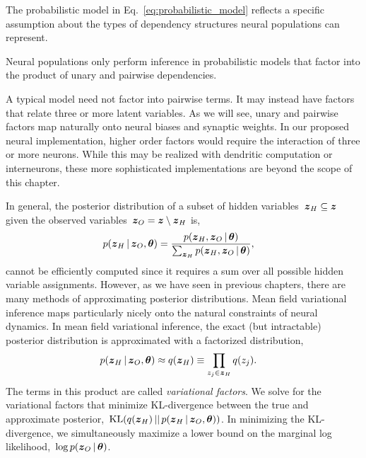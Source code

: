 The probabilistic model in Eq.~\ref{eq:probabilistic_model} reflects
a specific assumption about the types of dependency structures
neural populations can represent.

\begin{assumption}
  Neural populations only perform inference in probabilistic models
  that factor into the product of unary and pairwise dependencies. 
\end{assumption}

A typical model need not factor into pairwise terms. It may instead
have factors that relate three or more latent variables. As we will
see, unary and pairwise factors map naturally onto neural biases
and synaptic weights. In our proposed neural implementation, higher
order factors would require the interaction of three or more neurons.
While this may be realized with dendritic computation or interneurons,
these more sophisticated implementations are beyond the scope of this
chapter. 

In general, the posterior distribution of a subset of hidden
variables~$\boldsymbol{z}_H \subseteq \boldsymbol{z}$ 
given the observed variables~$\boldsymbol{z}_O = \boldsymbol{z} \setminus \boldsymbol{z}_H$ is,
\begin{align}
  p(\boldsymbol{z}_H \,|\, \boldsymbol{z}_O, \boldsymbol{\theta}) &=
  \frac{p(\boldsymbol{z}_H, \boldsymbol{z}_O \,|\, \boldsymbol{\theta})}
       {\sum_{\boldsymbol{z}_H} p(\boldsymbol{z}_H, \boldsymbol{z}_O \,|\, \boldsymbol{\theta})},
\end{align}
cannot be efficiently computed since it requires a sum over all
possible hidden variable assignments.
However, as we have seen in previous chapters, there are many methods of
approximating posterior distributions. Mean field variational
inference  maps particularly nicely onto the natural constraints
of neural dynamics. 
In mean field variational inference, the exact (but intractable)
posterior distribution is approximated with a factorized
distribution,
\begin{align}
  p(\boldsymbol{z}_H \,|\, \boldsymbol{z}_O, \boldsymbol{\theta}) &\approx q(\boldsymbol{z}_H) \equiv \prod_{z_j \in \boldsymbol{z}_H} q(z_j).
\end{align}
The terms in this product are called \emph{variational factors}.  We
solve for the variational factors that minimize KL-divergence between
the true and approximate posterior,~$\mathrm{KL}(q(\boldsymbol{z}_H) \,||\, p(\boldsymbol{z}_H
\,|\, \boldsymbol{z}_O, \boldsymbol{\theta}))$. In minimizing the KL-divergence, we
simultaneously maximize a lower bound on the marginal log
likelihood,~$\log p(\boldsymbol{z}_O \,|\, \boldsymbol{\theta})$.

